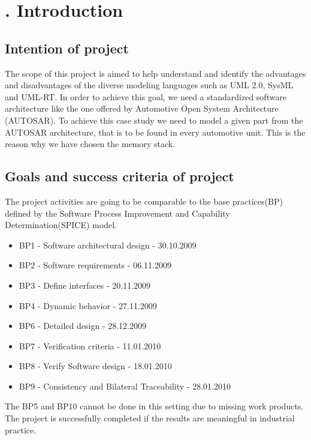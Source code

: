 \chapter[Introduction]{\thechapter. Introduction}
\section{Intention of project}
The scope of this project is aimed to help understand and identify the advantages and disadvantages of the diverse modeling languages such as UML 2.0, SysML and UML-RT. In order to achieve this goal, we need a standardized software architecture like the one offered by Automotive Open System Architecture (AUTOSAR).\newline
To achieve this case study we need to model a given part from the AUTOSAR architecture, that is to be found in every automotive unit. This is the reason why we have chosen the memory stack.
\section{Goals and success criteria of project}
The project activities are going to be comparable to the base practices(BP) defined by the Software Process Improvement and Capability Determination(SPICE) model.
\begin{itemize}
\item BP1 - Software architectural design - 30.10.2009
\item BP2 - Software requirements - 06.11.2009
\item BP3 - Define interfaces - 20.11.2009
\item BP4 - Dynamic behavior - 27.11.2009
\item BP6 - Detailed design - 28.12.2009
\item BP7 - Verification criteria - 11.01.2010
\item BP8 - Verify Software design - 18.01.2010
\item BP9 - Consistency and Bilateral Traceability - 28.01.2010
\end{itemize}
The BP5 and BP10 cannot be done in this setting due to missing work products. The project is successfully completed if the results are meaningful in industrial practice.